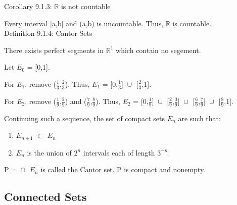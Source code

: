 { \color{orange} Corollary 9.1.3: $\mathbb{R}$ is not countable } 

	\begin{adjustbox}{minipage=14cm, right, vspace=0.1cm 0cm}
		Every interval [a,b] and (a,b) is uncountable.
		Thus, $\mathbb{R}$ is countable. \\
	\end{adjustbox}

{ \color{blue} Definition 9.1.4: Cantor Sets } 

	\begin{adjustbox}{minipage=14cm, right, vspace=0.1cm 0cm}
		There exists perfect segments in $\mathbb{R}^1$ which contain no segement.

		Let $E_0$ = [0,1].

		For $E_1$, remove ($\frac{1}{3}$,$\frac{2}{3}$).
		Thus, $E_1$ = [0,$\frac{1}{3}$] $\cup_{}^{}$ [$\frac{2}{3}$,1].

		For $E_2$, remove ($\frac{1}{9}$,$\frac{2}{9}$) and ($\frac{7}{9}$,$\frac{8}{9}$).
		Thus, $E_2$ = [0,$\frac{1}{9}$] $\cup_{}^{}$ [$\frac{2}{9}$,$\frac{3}{9}$] $\cup_{}^{}$
		[$\frac{6}{9}$,$\frac{7}{9}$] $\cup_{}^{}$ [$\frac{8}{9}$,1].

		Continuing such a sequence, the set of compact sets $E_n$ are such that:

		\begin{enumerate}[label=(\alph*), leftmargin=2cm, itemsep=0.1cm]
			\item $E_{n+1}$ $\subset$ $E_n$
			\item $E_n$ is the union of $2^n$ intervals each of length $3^{-n}$.
		\end{enumerate}

		P = $\cap_{}^{}$ $E_n$ is called the Cantor set.
		P is compact and nonempty.
	\end{adjustbox}


\subsection{ Connected Sets }
























































